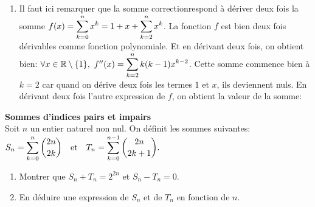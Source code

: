 \documentclass[a4paper, 11pt,reqno]{article}
\begin{document}
\begin{correction}
\begin{enumerate}
\item Il faut ici remarquer que la somme correctionrespond \`{a} d\'eriver deux fois la somme $f(x)=\displaystyle \sum\limits_{k=0}^{n} x^k=1+x+\displaystyle \sum\limits_{k=2}^{n} x^k$. La fonction $f$ est bien deux fois d\'erivables comme fonction polynomiale.
Et en d\'erivant deux fois, on obtient bien: $\forall x\in\mathbb{R}\setminus\lbrace 1\rbrace,\ f^{\prime\prime}(x)=\displaystyle \sum\limits_{k=2}^{n} k(k-1)x^{k-2}$. Cette somme commence bien \`{a} $k=2$ car quand on d\'erive deux fois les termes $1$ et $x$, ils deviennent nuls. En d\'erivant deux fois l'autre expression de $f$, on obtient la valeur de la somme:\\ 
\vsec
 \begin{center}
\end{center}
\end{enumerate}
\end{correction}













\begin{exercice}   \; \textbf{Sommes d'indices pairs et impairs}\\
\noindent Soit $n$ un entier naturel non nul. On d\'efinit les sommes suivantes: $S_n=\displaystyle \sum\limits_{k=0}^{n} \binom{2n}{2k}\quad \hbox{et}\quad T_n=\displaystyle \sum\limits_{k=0}^{n-1} \binom{2n}{2k+1}.$
\begin{enumerate}
\item Montrer que $S_n+T_n=2^{2n}$ et $S_n-T_n=0$.
\item En d\'eduire une expression de $S_n$ et de $T_n$ en fonction de $n$.
\end{enumerate} 
\end{exercice}
\end{document}
